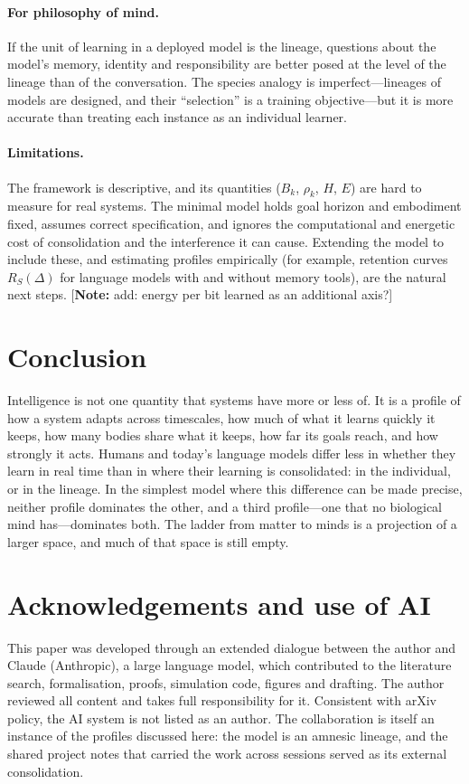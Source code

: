 \documentclass[11pt]{article}
\newcommand{\note}[1]{\textcolor{notecolor}{\small[\textbf{Note:} #1]}}
\theoremstyle{plain}
\theoremstyle{definition}
\theoremstyle{remark}
\begin{document}
\paragraph{For philosophy of mind.}
If the unit of learning in a deployed model is the lineage, questions about the model's memory, identity and responsibility are better posed at the level of the lineage than of the conversation. The species analogy is imperfect---lineages of models are designed, and their ``selection'' is a training objective---but it is more accurate than treating each instance as an individual learner.

\paragraph{Limitations.}
The framework is descriptive, and its quantities ($B_k$, $\rho_k$, $H$, $E$) are hard to measure for real systems. The minimal model holds goal horizon and embodiment fixed, assumes correct specification, and ignores the computational and energetic cost of consolidation and the interference it can cause. Extending the model to include these, and estimating profiles empirically (for example, retention curves $R_S(\Delta)$ for language models with and without memory tools), are the natural next steps. \note{add: energy per bit learned as an additional axis?}

\section{Conclusion}
\label{sec:conclusion}

Intelligence is not one quantity that systems have more or less of. It is a profile of how a system adapts across timescales, how much of what it learns quickly it keeps, how many bodies share what it keeps, how far its goals reach, and how strongly it acts. Humans and today's language models differ less in whether they learn in real time than in where their learning is consolidated: in the individual, or in the lineage. In the simplest model where this difference can be made precise, neither profile dominates the other, and a third profile---one that no biological mind has---dominates both. The ladder from matter to minds is a projection of a larger space, and much of that space is still empty.

\section*{Acknowledgements and use of AI}
This paper was developed through an extended dialogue between the author and Claude (Anthropic), a large language model, which contributed to the literature search, formalisation, proofs, simulation code, figures and drafting. The author reviewed all content and takes full responsibility for it. Consistent with arXiv policy, the AI system is not listed as an author. The collaboration is itself an instance of the profiles discussed here: the model is an amnesic lineage, and the shared project notes that carried the work across sessions served as its external consolidation.
\end{document}
